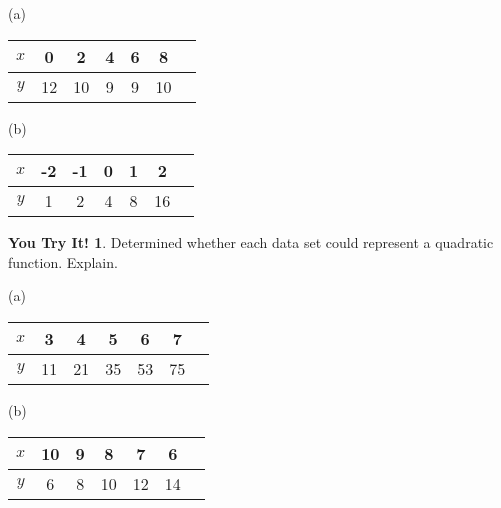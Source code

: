 \documentclass{report}
\theoremstyle{definition}
\newtheorem{youtry}{\textbf{You Try It!}}
\begin{document}
\begin{minipage}[t]{0.45\linewidth}
(a)\\

\vspace{-1.75cm}

\begin{center} 
\begin{tabular}[t]{|c|c|c|c|c|c|c|}
\hline
$x$&0&2&4&6&8\\
\hline
$y$&12&10&9&9&10\\
\hline
\end{tabular}
\end{center}
\end{minipage}
\hfill
\begin{minipage}[t]{0.45\linewidth}
(b)\\

\vspace{-1.75cm}

\begin{center}
\begin{tabular}[t]{|c|c|c|c|c|c|c|}
\hline
$x$&-2&-1&0&1&2\\
\hline
$y$&1&2&4&8&16\\
\hline
\end{tabular}
\end{center}
\end{minipage}


\vspace{2.5cm}


 \begin{youtry}
 Determined whether each data set could represent a quadratic function. Explain.
 \end{youtry}

\begin{minipage}[t]{0.45\linewidth}
(a) \\

\vspace{-1.75cm}

\begin{center}
	\begin{tabular}[t]{|c|c|c|c|c|c|c|}
	\hline
	$x$&3&4&5&6&7\\
	\hline
	$y$&11&21&35&53&75\\
	\hline
	\end{tabular}
\end{center}
\end{minipage}
\hfill
\begin{minipage}[t]{0.45\linewidth}
(b)\\

\vspace{-1.75cm}

\begin{center}
\begin{tabular}[t]{|c|c|c|c|c|c|c|}
\hline
$x$&10&9&8&7&6\\
\hline
$y$&6&8&10&12&14\\
\hline
\end{tabular}
\end{center}
\end{minipage}
\end{document}

